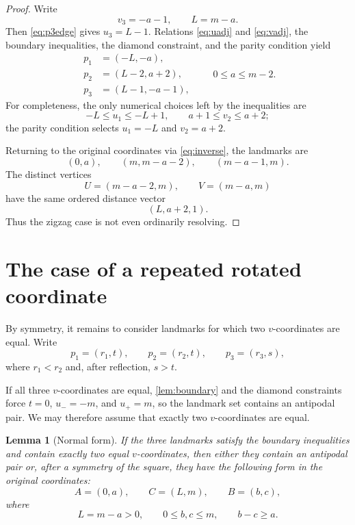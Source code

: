 \documentclass[11pt]{amsart}
\newtheorem{lemma}[lemma]{Lemma}
\theoremstyle{remark}
\begin{document}
\begin{proof}
Write
\[
 v_3=-a-1,
 \qquad
 L=m-a.
\]
Then \eqref{eq:p3edge} gives $u_3=L-1$.  Relations \eqref{eq:uadj} and \eqref{eq:vadj}, the boundary inequalities, the diamond constraint, and the parity condition yield
\begin{equation}\label{eq:zigzagnormal}
\begin{aligned}
 p_1&=(-L,-a),\\
 p_2&=(L-2,a+2),\\
 p_3&=(L-1,-a-1),
\end{aligned}
\qquad
0\le a\le m-2.
\end{equation}
For completeness, the only numerical choices left by the inequalities are
\[
 -L\le u_1\le -L+1,
 \qquad
 a+1\le v_2\le a+2;
\]
the parity condition selects $u_1=-L$ and $v_2=a+2$.

Returning to the original coordinates via \eqref{eq:inverse}, the landmarks are
\[
 (0,a),
 \qquad
 (m,m-a-2),
 \qquad
 (m-a-1,m).
\]
The distinct vertices
\[
 U=(m-a-2,m),
 \qquad
 V=(m-a,m)
\]
have the same ordered distance vector
\[
 (L,a+2,1).
\]
Thus the zigzag case is not even ordinarily resolving.
\end{proof}

\section{The case of a repeated rotated coordinate}\label{sec:repeated}

By symmetry, it remains to consider landmarks for which two $v$-coordinates are equal.  Write
\[
 p_1=(r_1,t),
 \qquad
 p_2=(r_2,t),
 \qquad
 p_3=(r_3,s),
\]
where $r_1<r_2$ and, after reflection, $s>t$.

If all three $v$-coordinates are equal, \cref{lem:boundary} and the diamond constraints force $t=0$, $u_-=-m$, and $u_+=m$, so the landmark set contains an antipodal pair.  We may therefore assume that exactly two $v$-coordinates are equal.

\begin{lemma}[Normal form]\label{lem:normalform}
If the three landmarks satisfy the boundary inequalities and contain exactly two equal $v$-coordinates, then either they contain an antipodal pair or, after a symmetry of the square, they have the following form in the original coordinates:
\begin{equation}\label{eq:normalform}
 A=(0,a),
 \qquad
 C=(L,m),
 \qquad
 B=(b,c),
\end{equation}
where
\begin{equation}\label{eq:normalconstraints}
 L=m-a>0,
 \qquad
 0\le b,c\le m,
 \qquad
 b-c\ge a.
\end{equation}
\end{lemma}
\end{document}
